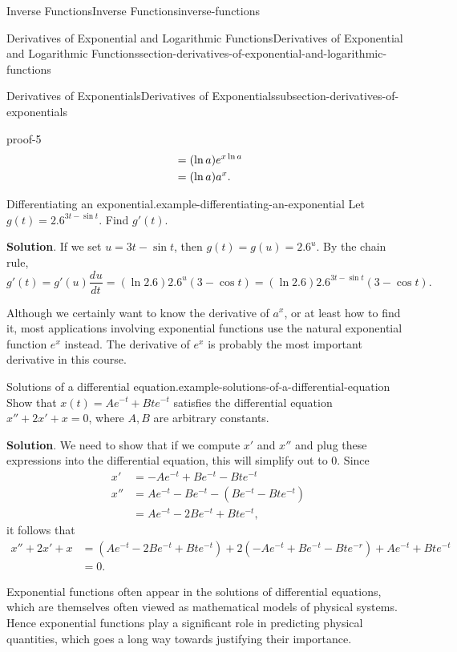 \documentclass[oneside,10pt,]{book}
\renewcommand{\qedhere}{\relax}
\numberwithin{equation}{section}
\newcommand{\dv}[3][]{\dfrac{d^{#1} #2}{d #3^{#1}}}
\begin{document}
\begin{chapterptx}{Inverse Functions}{}{Inverse Functions}{}{}{inverse-functions}
\begin{sectionptx}{Derivatives of Exponential and Logarithmic Functions}{}{Derivatives of Exponential and Logarithmic Functions}{}{}{section-derivatives-of-exponential-and-logarithmic-functions}
\begin{subsectionptx}{Derivatives of Exponentials}{}{Derivatives of Exponentials}{}{}{subsection-derivatives-of-exponentials}
\begin{proofptx}{}{proof-5}
\begin{align*}
& = (\ln a)e^{x\ln a} \\
& = (\ln a)a^{x}. \qedhere
\end{align*}
%
\end{proofptx}
\begin{example}{Differentiating an exponential.}{example-differentiating-an-exponential}%
\hypertarget{p-229}{}%
Let \(g(t) = 2.6^{3t - \sin t}\). Find \(g'(t)\).%
\par\smallskip%
\noindent\textbf{Solution}.\hypertarget{solution-49}{}\quad%
\hypertarget{p-230}{}%
If we set \(u = 3t - \sin t\), then \(g(t) = g(u) = 2.6^{u}\). By the chain rule, \(g'(t) = g'(u)\dv{u}{t} = (\ln2.6)2.6^{u}(3-\cos t) = (\ln2.6)2.6^{3t-\sin t}(3-\cos t).\)%
\end{example}
\hypertarget{p-231}{}%
Although we certainly want to know the derivative of \(a^{x}\), or at least how to find it, most applications involving exponential functions use the natural exponential function \(e^{x}\) instead. The derivative of \(e^{x}\) is probably the most important derivative in this course.%
\begin{example}{Solutions of a differential equation.}{example-solutions-of-a-differential-equation}%
\hypertarget{p-232}{}%
Show that \(x(t) = Ae^{-t} + Bte^{-t}\) satisfies the differential equation \(x'' + 2x' + x = 0\), where \(A,B\) are arbitrary constants.%
\par\smallskip%
\noindent\textbf{Solution}.\hypertarget{solution-50}{}\quad%
\hypertarget{p-233}{}%
We need to show that if we compute \(x'\) and \(x''\) and plug these expressions into the differential equation, this will simplify out to \(0\). Since%
\begin{align*}
x' & = -Ae^{-t} +Be^{-t} - Bte^{-t} \\
x'' & = Ae^{-t} - Be^{-t} - (Be^{-t} - Bte^{-t}) \\
& = Ae^{-t} - 2Be^{-t} + Bte^{-t}, 
\end{align*}
it follows that%
\begin{align*}
x'' + 2x' + x & = (Ae^{-t} - 2Be^{-t} + Bte^{-t}) + 2(-Ae^{-t} + Be^{-t} - Bte^{-r}) + Ae^{-t} + Bte^{-t} \\
& = 0. 
\end{align*}
%
\end{example}
\hypertarget{p-234}{}%
Exponential functions often appear in the solutions of differential equations, which are themselves often viewed as mathematical models of physical systems. Hence exponential functions play a significant role in predicting physical quantities, which goes a long way towards justifying their importance.%

\end{subsectionptx}
\end{sectionptx}
\end{chapterptx}
\end{document}
